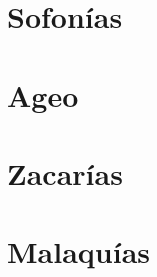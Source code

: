 \chapter{Sofonías}
\begin{multicols}{2}
  \raggedcolumns
  \parskip=0pt \relax
  
\end{multicols}

\chapter{Ageo}
\begin{multicols}{2}
  \raggedcolumns
  \parskip=0pt \relax
  
\end{multicols}

\chapter{Zacarías}
\begin{multicols}{2}
  \raggedcolumns
  \parskip=0pt \relax
  
\end{multicols}

\chapter{Malaquías}
\begin{multicols}{2}
  \raggedcolumns
  \parskip=0pt \relax
  
\end{multicols}

\newpage

\pagestyle{empty}

